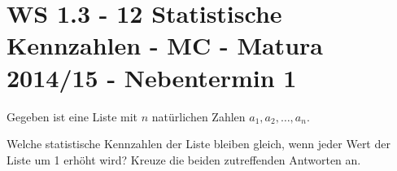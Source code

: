 \section{WS 1.3 - 12 Statistische Kennzahlen - MC - Matura 2014/15 - Nebentermin 1}

\begin{beispiel}[WS 1.3]{1}
Gegeben ist eine Liste mit $n$ natürlichen Zahlen $a_1,a_2, \ldots, a_n$. \leer

Welche statistische Kennzahlen der Liste bleiben gleich, wenn jeder Wert der Liste um 1 erhöht wird? Kreuze die beiden zutreffenden Antworten an.

\end{beispiel}